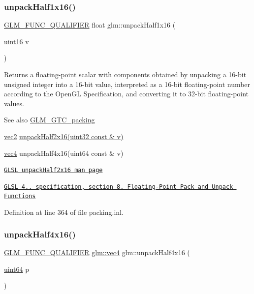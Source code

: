 \subsubsection{\texorpdfstring{unpack\+Half1x16()}{unpackHalf1x16()}}
{\footnotesize\ttfamily \hyperlink{setup_8hpp_a33fdea6f91c5f834105f7415e2a64407}{G\+L\+M\+\_\+\+F\+U\+N\+C\+\_\+\+Q\+U\+A\+L\+I\+F\+I\+ER} float glm\+::unpack\+Half1x16 (\begin{DoxyParamCaption}\item[{\hyperlink{group__gtc__type__precision_gad8c2939e1fdd8e5828b31d95c52255d5}{uint16}}]{v }\end{DoxyParamCaption})}

Returns a floating-\/point scalar with components obtained by unpacking a 16-\/bit unsigned integer into a 16-\/bit value, interpreted as a 16-\/bit floating-\/point number according to the Open\+GL Specification, and converting it to 32-\/bit floating-\/point values.

\begin{DoxySeeAlso}{See also}
\hyperlink{group__gtc__packing}{G\+L\+M\+\_\+\+G\+T\+C\+\_\+packing} 

\hyperlink{group__core__types_gaa1618f51db67eaa145db101d8c8431d8}{vec2} \hyperlink{group__core__func__packing_ga4051804cc2c930ba4ca73382b79edf1d}{unpack\+Half2x16(uint32 const \& v)} 

\hyperlink{group__core__types_ga5881b1b022d7fd1b7218f5916532dd02}{vec4} unpack\+Half4x16(uint64 const \& v) 

\href{http://www.opengl.org/sdk/docs/manglsl/xhtml/unpackHalf2x16.xml}{\tt G\+L\+SL unpack\+Half2x16 man page} 

\href{http://www.opengl.org/registry/doc/GLSLangSpec.4.20.8.pdf}{\tt G\+L\+SL 4.. specification, section 8. Floating-\/\+Point Pack and Unpack Functions} 
\end{DoxySeeAlso}


Definition at line 364 of file packing.\+inl.

\mbox{\label{group__gtc__packing_gaea526d6491ad40401eac34803984bf27}} 
\subsubsection{\texorpdfstring{unpack\+Half4x16()}{unpackHalf4x16()}}
{\footnotesize\ttfamily \hyperlink{setup_8hpp_a33fdea6f91c5f834105f7415e2a64407}{G\+L\+M\+\_\+\+F\+U\+N\+C\+\_\+\+Q\+U\+A\+L\+I\+F\+I\+ER} \hyperlink{group__core__types_ga5881b1b022d7fd1b7218f5916532dd02}{glm\+::vec4} glm\+::unpack\+Half4x16 (\begin{DoxyParamCaption}\item[{\hyperlink{group__gtc__type__precision_gae3632bf9b37da66233d78930dd06378a}{uint64}}]{p }\end{DoxyParamCaption})}

